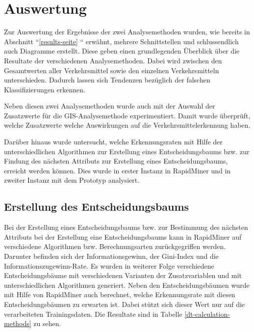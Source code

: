 \chapter{Auswertung}
\label{auswertung}

Zur Auswertung der Ergebnisse der zwei Analysemethoden wurden, wie bereits in Abschnitt ``\ref{results-seite}  `` erwähnt, mehrere Schnittstellen und schlussendlich auch Diagramme erstellt. Diese geben einen grundlegenden Überblick über die Resultate der verschiedenen Analysemethoden. Dabei wird zwischen den Gesamtwerten aller Verkehrsmittel sowie den einzelnen Verkehrsmitteln unterschieden. Dadurch lassen sich Tendenzen bezüglich der falschen Klassifizierungen erkennen. 
 
Neben diesen zwei Analysemethoden wurde auch mit der Auswahl der Zusatzwerte für die GIS-Analysemethode experimentiert. Damit wurde überprüft, welche Zusatzwerte welche Auswirkungen auf die Verkehrsmittelerkennung haben. 

Darüber hinaus wurde untersucht, welche Erkennungsraten mit Hilfe der unterschiedlichen Algorithmen zur Erstellung eines Entscheidungsbaums bzw. zur Findung des nächsten Attributs zur Erstellung eines Entscheidungsbaums, erreicht werden können. Dies wurde in erster Instanz in RapidMiner und in zweiter Instanz mit dem Prototyp analysiert.
\clearpage

\section{Erstellung des Entscheidungsbaums}
\label{rapidMinerResultat}
Bei der Erstellung eines Entscheidungsbaums bzw. zur Bestimmung des nächsten Attributs bei der Erstellung eine Entscheidungsbaums kann in RapidMiner auf verschiedene Algorithmen bzw. Berechnungsarten zurückgegriffen werden. Darunter befinden sich der Informationsgewinn, der Gini-Index und die Informationszugewinn-Rate. Es wurden in weiterer Folge verschiedene Entscheidungsbäume mit verschiedenen Varianten der Zusatzvariablen und mit unterschiedlichen Algorithmen generiert. Neben den Entscheidungsbäumen wurde mit Hilfe von RapidMiner auch berechnet, welche Erkennungsrate mit diesen Entscheidungsbäumen zu erwarten ist. Dabei stützt sich dieser Wert nur auf die verarbeiteten Trainingsdaten. Die Resultate sind in Tabelle \ref{dt-calculation-methods} zu sehen. 

